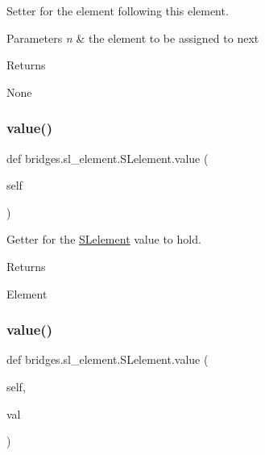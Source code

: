 Setter for the element following this element. 


\begin{DoxyParams}{Parameters}
{\em n} & the element to be assigned to next \\
\hline
\end{DoxyParams}
\begin{DoxyReturn}{Returns}


None 
\end{DoxyReturn}
\mbox{\label{classbridges_1_1sl__element_1_1_s_lelement_a64ede02c56a4efaaa4c64a245bd01dd0}} 
\subsubsection{\texorpdfstring{value()}{value()}\hspace{0.1cm}{\footnotesize\ttfamily [1/2]}}
{\footnotesize\ttfamily def bridges.\+sl\+\_\+element.\+S\+Lelement.\+value (\begin{DoxyParamCaption}\item[{}]{self }\end{DoxyParamCaption})}



Getter for the \hyperlink{classbridges_1_1sl__element_1_1_s_lelement}{S\+Lelement} value to hold. 

\begin{DoxyReturn}{Returns}


Element 
\end{DoxyReturn}
\mbox{\label{classbridges_1_1sl__element_1_1_s_lelement_a7653b41a8bc2c8ba7a71f07c8b0b8f3f}} 
\subsubsection{\texorpdfstring{value()}{value()}\hspace{0.1cm}{\footnotesize\ttfamily [2/2]}}
{\footnotesize\ttfamily def bridges.\+sl\+\_\+element.\+S\+Lelement.\+value (\begin{DoxyParamCaption}\item[{}]{self,  }\item[{}]{val }\end{DoxyParamCaption})}



